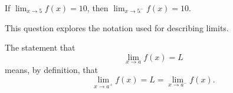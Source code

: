 \documentclass{ximera}
\author{Emma Smith Zbarsky}
\begin{document}
\begin{exercise}

If $\displaystyle \lim_{x\to 5}f(x) = 10$, then
$\displaystyle \lim_{x\to 5^-} f(x) = 10.$


\begin{hint}
This question explores the notation used for describing limits.
\end{hint}


\begin{hint}
The statement that \[\lim_{x\to a} f(x) = L\] means, by definition, that
\[\lim_{x\to a^+} f(x) = L = \lim_{x\to a^-}f(x).\]
\end{hint}


\begin{multipleChoice}
\end{multipleChoice}

\end{exercise}
\end{document}

